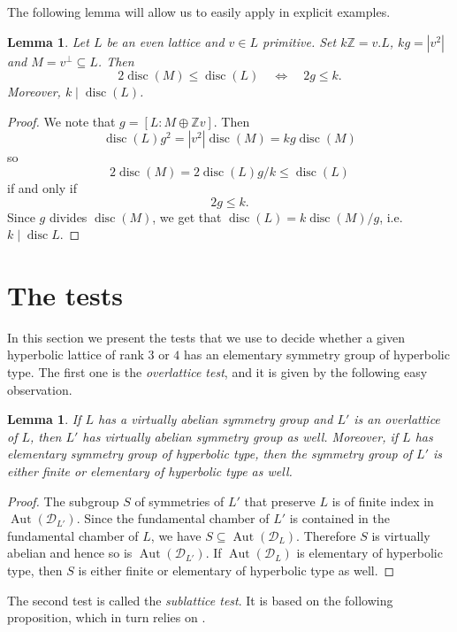 \documentclass[11pt,letterpaper]{amsart}
\DeclareMathOperator{\Aut}{Aut}
\DeclareMathOperator{\disc}{disc}
\newcommand{\ZZ}{\mathbb{Z}}
\newtheorem{lemma}[theorem]{Lemma}
\theoremstyle{definition}
\theoremstyle{remark}
\begin{document}
The following lemma will allow us to easily apply  in explicit examples.

\begin{lemma}\label{lem:easy_vectors}
 Let $L$ be an even lattice and $v \in L$ primitive. Set $k \ZZ = v.L$, $kg=|v^2|$ and $M=v^\perp \subseteq L$.
 Then 
 \[2\disc(M) \leq \disc(L) \quad \Leftrightarrow \quad 2g \leq k.\]
 Moreover, $k \mid \disc(L)$. 
\end{lemma}
\begin{proof}
We note that $g=[L:M \oplus \ZZ v]$. Then
\[\disc(L) g^2 = |v^2|\disc(M)=kg \disc(M)\]
so 
\[2\disc(M) = 2 \disc(L)g/k \leq \disc(L)\]
if and only if
\[2 g \leq k.\]
Since $g$ divides $\disc(M)$, we get that $\disc(L)=k \disc(M)/g$, i.e. $k \mid \disc L$. 
\end{proof}



\section{The tests} \label{sec:tests}

In this section we present the tests that we use to decide whether a given hyperbolic lattice of rank $3$ or $4$ has an elementary symmetry group of hyperbolic type. The first one is the \emph{overlattice test}, and it is given by the following easy observation.

\begin{lemma}\label{lem:overlattice}
If $L$ has a virtually abelian symmetry group and $L'$ is an overlattice of $L$, then $L'$ has virtually abelian symmetry group as well.
Moreover, if $L$ has elementary symmetry group of hyperbolic type, then the symmetry group of $L'$ is either finite or elementary of hyperbolic type as well.
\end{lemma}
\begin{proof}
The subgroup $S$ of symmetries of $L'$ that preserve $L$ is of finite index in $\Aut(\mathcal{D}_{L'})$.
Since the fundamental chamber of $L'$ is contained in the fundamental chamber of $L$, we have $S \subseteq \Aut(\mathcal{D}_L)$. Therefore $S$ is virtually abelian and hence so is $\Aut(\mathcal{D}_{L'})$.
If $\Aut(\mathcal{D}_L)$ is elementary of hyperbolic type, then $S$ is either finite or elementary of hyperbolic type as well.
\end{proof}

The second test is called the \emph{sublattice test}. It is based on the following proposition, which in turn relies on .
\end{document}

